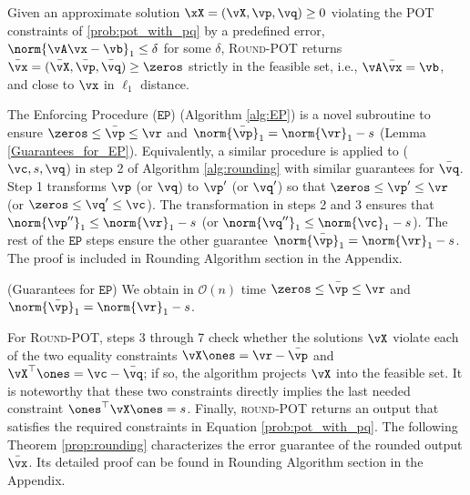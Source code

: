 Given an approximate solution $\xX = (\vX, \vp, \vq) \geq 0$ violating the POT constraints of \eqref{prob:pot_with_pq} by a predefined error, $\norm{\vA \vx - \vb}_1 \leq \delta$ for some $\delta$,  \textsc{Round-POT} returns $\Bar{\vx} = (\Bar{\vX}, \Bar{\vp}, \Bar{\vq}) \geq \zeros$ strictly in the feasible set, i.e., $\vA \Bar{\vx} = \vb$, and close to $\vx$ in $\ell_1$ distance. 

The Enforcing Procedure ($\mathtt{EP}$) (Algorithm \ref{alg:EP}) is a novel subroutine to ensure $\zeros \leq \bar{\vp} \leq \vr$ and $\norm{\bar{\vp}}_1 = \norm{\vr}_1 - s$ (Lemma \ref{Guarantees_for_EP}). Equivalently, a similar procedure is applied to ($\vc, s, \vq$) in step 2 of Algorithm \ref{alg:rounding} with similar guarantees for $\bar{\vq}$. Step 1 transforms $\vp$ (or $\vq$) to $\vp'$ (or $\vq'$) so that $\zeros \leq \vp' \leq \vr$ (or $\zeros \leq \vq' \leq \vc$). The transformation in steps 2 and 3 ensures that $\norm{\vp''}_1 \leq \norm{\vr}_1 - s$ (or $\norm{\vq''}_1 \leq \norm{\vc}_1 - s$). The rest of the $\mathtt{EP}$ steps ensure the other guarantee $\norm{\bar{\vp}}_1 = \norm{\vr}_1 - s$.
The proof is included in Rounding Algorithm section in the Appendix. 
\begin{lemma}
    \label{Guarantees_for_EP}
    (Guarantees for $\mathtt{EP}$) We obtain in $\mathcal{O}(n)$ time $\zeros \leq \bar{\vp} \leq \vr$ and $\norm{\bar{\vp}}_1 = \norm{\vr}_1 - s$. 
\end{lemma}
For \textsc{Round-POT}, steps 3 through 7 check whether the solutions $\vX$ violate each of the two equality constraints $\vX \ones = \vr - \bar{\vp}$ and $\vX^\top \ones = \vc - \bar{\vq}$; if so, the algorithm projects $\vX$ into the feasible set. It is noteworthy that these two constraints directly implies the last needed constraint $\ones^\top \vX \ones = s$. Finally, \textsc{round-POT} returns an output that satisfies the required constraints in Equation \eqref{prob:pot_with_pq}.
The following Theorem \ref{prop:rounding} characterizes the error guarantee of the rounded output $\Bar{\vx}$. Its detailed proof can be found in Rounding Algorithm section in the Appendix.

